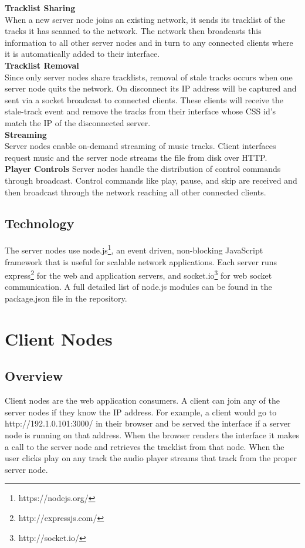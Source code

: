 \documentclass[12pt]{article}
\begin{document}
\textbf{Tracklist Sharing}\\
When a new server node joins an existing network, it sends its tracklist of the tracks it has scanned to the network. The network then broadcasts this information to all other server nodes and in turn to any connected clients where it is automatically added to their interface.\\

\textbf{Tracklist Removal}\\
Since only server nodes share tracklists, removal of stale tracks occurs when one server node quits the network. On disconnect its IP address will be captured and sent via a socket broadcast to connected clients. These clients will receive the stale-track event and remove the tracks from their interface whose CSS id's match the IP of the disconnected server.\\

\textbf{Streaming}\\
Server nodes enable on-demand streaming of music tracks. Client interfaces request music and the server node streams the file from disk over HTTP.\\

\textbf{Player Controls}
Server nodes handle the distribution of control commands through broadcast. Control commands like play, pause, and skip are received and then broadcast through the network reaching all other connected clients.

\subsection{Technology}
The server nodes use node.js\footnote{https://nodejs.org/}, an event driven, non-blocking JavaScript framework that is useful for scalable network applications. Each server runs express\footnote{http://expressjs.com/} for the web and application servers, and socket.io\footnote{http://socket.io/} for web socket communication. A full detailed list of node.js modules can be found in the package.json file in the repository.

\section{Client Nodes}

\subsection{Overview}
Client nodes are the web application consumers. A client can join any of the server nodes if they know the IP address. For example, a client would go to http://192.1.0.101:3000/ in their browser and be served the interface if a server node is running on that address. When the browser renders the interface it makes a call to the server node and retrieves the tracklist from that node. When the user clicks play on any track the audio player streams that track from the proper server node.
\end{document}
